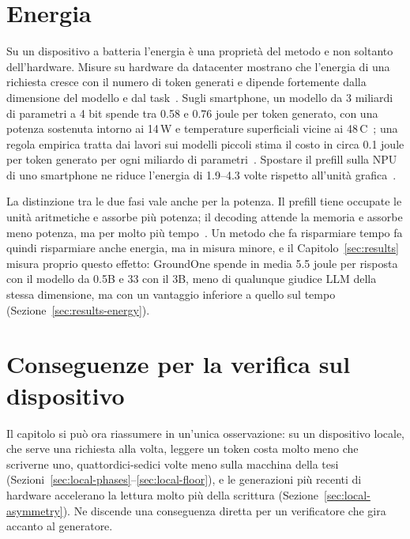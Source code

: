 \section{Energia}
\label{sec:local-energy}

Su un dispositivo a batteria l'energia è una proprietà del metodo e non soltanto dell'hardware. Misure su hardware da
datacenter mostrano che l'energia di una richiesta cresce con il numero di token generati e dipende fortemente dalla
dimensione del modello e dal task~\cite{samsi2023words,luccioni2024power}. Sugli smartphone, un modello da 3 miliardi di
parametri a 4 bit spende tra 0.58 e 0.76 joule per token generato, con una potenza sostenuta intorno ai 14\,W e
temperature superficiali vicine ai 48\,\textdegree C~\cite{laskaridis2024melting}; una regola empirica tratta dai lavori
sui modelli piccoli stima il costo in circa 0.1 joule per token generato per ogni miliardo di
parametri~\cite{liu2024mobilellm}. Spostare il prefill sulla NPU di uno smartphone ne riduce l'energia di 1.9--4.3 volte
rispetto all'unità grafica~\cite{xu2025npu}.

La distinzione tra le due fasi vale anche per la potenza. Il prefill tiene occupate le unità aritmetiche e assorbe più
potenza; il decoding attende la memoria e assorbe meno potenza, ma per molto più tempo~\cite{patel2024splitwise}. Un
metodo che fa risparmiare tempo fa quindi risparmiare anche energia, ma in misura minore, e il Capitolo~\ref{sec:results}
misura proprio questo effetto: GroundOne spende in media 5.5 joule per risposta con il modello da 0.5B e 33 con il 3B, meno
di qualunque giudice LLM della stessa dimensione, ma con un vantaggio inferiore a quello sul tempo
(Sezione~\ref{sec:results-energy}).

\section{Conseguenze per la verifica sul dispositivo}
\label{sec:local-verification}

Il capitolo si può ora riassumere in un'unica osservazione: su un dispositivo locale, che serve una richiesta alla
volta, leggere un token costa molto meno che scriverne uno, quattordici-sedici volte meno sulla macchina della tesi
(Sezioni~\ref{sec:local-phases}--\ref{sec:local-floor}), e le generazioni più recenti di hardware accelerano la lettura
molto più della scrittura (Sezione~\ref{sec:local-asymmetry}). Ne discende una conseguenza diretta per un verificatore che gira
accanto al generatore.

